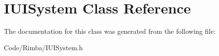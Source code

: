 \hypertarget{class_i_u_i_system}{}\section{I\+U\+I\+System Class Reference}
\label{class_i_u_i_system}


The documentation for this class was generated from the following file\+:\begin{DoxyCompactItemize}
\item 
Code/\+Rimba/I\+U\+I\+System.\+h\end{DoxyCompactItemize}
